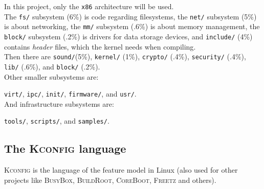 \documentclass[a4paper,11pt]{report}
\newcommand{\figa}{
    \begin{figure}[!htpb]
    \centering
}
\newcommand{\figb}[2]{
    \caption{#1}
    \label{#2}
    \end{figure}
}
\begin{document}
In this project, only the \texttt{x86} architecture will be used.
\\

The \texttt{fs/} subsystem (6\%) is code regarding filesystems, the 
\texttt{net/} subsystem (5\%) is about networking, the \texttt{mm/} 
subsystem (.6\%) is about memory management, the \texttt{block/} subsystem 
(.2\%) is drivers for data storage devices, and \texttt{include/} (4\%) 
contains \emph{header} files, which the kernel needs when 
compiling\cite{linuxorg}.
\\

Then there are \texttt{sound/}(5\%),  \texttt{kernel/} 
(1\%), \texttt{crypto/} (.4\%), \texttt{security/}  (.4\%), \texttt{lib/} 
(.6\%), and \texttt{block/} (.2\%).
\\

Other smaller subsystems are:

\texttt{virt/}, \texttt{ipc/}, \texttt{init/}, \texttt{firmware/}, and \texttt{usr/}.
\\

And infrastructure subsystems are:

\texttt{tools/}, \texttt{scripts/}, and \texttt{samples/}.

            \subsection{The \textsc{Kconfig} language} 
\textsc{Kconfig} is the language of the feature model in Linux (also used for 
other projects like \textsc{BusyBox}, \textsc{BuildRoot}, \textsc{CoreBoot}, 
\textsc{Freetz} and others)\cite[p. 4]{VarModSSD}.
\end{document}
